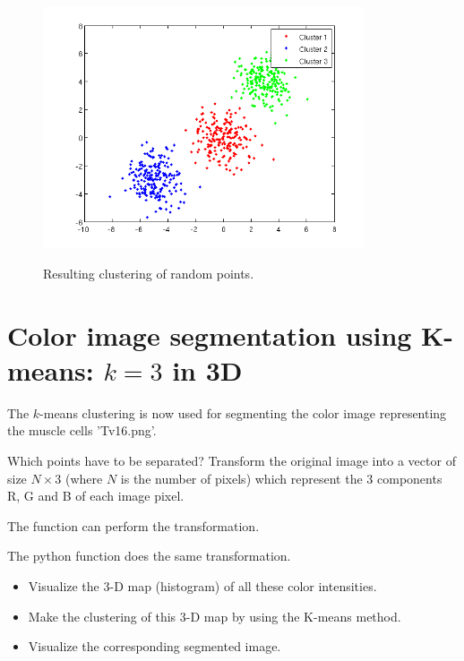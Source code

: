 \vspace*{-8pt}

\begin{figure}[htbp]
\centering\caption{Resulting clustering of random points.}%
\includegraphics[width=9.5cm]{clusters.png}%
 \label{fig:histoseg:kmeans}%
\end{figure}

\vspace*{-8pt}

\section{Color image segmentation using K-means: $k=3$ in 3D}

The $k$-means clustering is now used for segmenting the color image representing the muscle cells 'Tv16.png'.

\begin{qbox}
Which points have to be separated? Transform the original image into a vector of size $N\times 3$ (where $N$ is the number of pixels) which represent the $3$ components R, G and B of each image pixel.
\end{qbox}

 \begin{mcomment}
\begin{mremark}The \matlabregistered{} function  can perform the transformation.
 \end{mremark}
\end{mcomment}
\begin{pcomment}
\begin{premark}
The python function  does the same transformation.
\end{premark}
\end{pcomment}

\begin{qbox} 
 \begin{itemize}
 \item Visualize the 3-D map (histogram) of all these color intensities.
 \item Make the clustering of this 3-D map by using the K-means method. 
 \item Visualize the corresponding segmented image.
\end{itemize}
\end{qbox}
